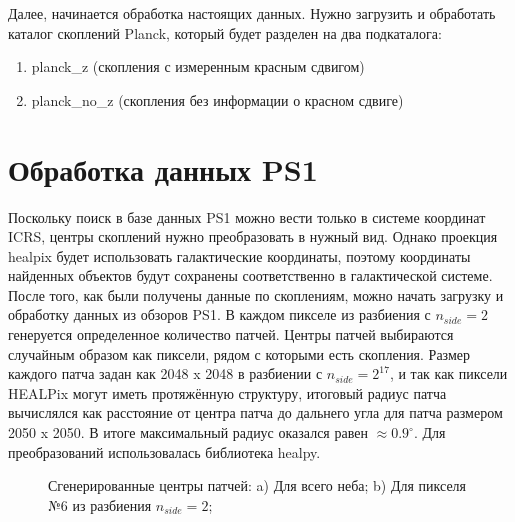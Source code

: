 Далее, начинается обработка настоящих данных. Нужно загрузить и обработать каталог скоплений Planck, 
который будет разделен на два подкаталога: 
\begin{enumerate}
	\item planck\_z (скопления с измеренным красным сдвигом)
	\item planck\_no\_z (скопления без информации о красном сдвиге)
\end{enumerate}

\section{Обработка данных PS1}

Поскольку поиск в базе данных PS1 можно вести только в системе координат ICRS, центры скоплений 
нужно преобразовать в нужный вид. Однако проекция healpix будет использовать галактические 
координаты, поэтому координаты найденных объектов будут сохранены соответственно в галактической 
системе.\\

После того, как были получены данные по скоплениям, можно начать загрузку и обработку данных из 
обзоров PS1. В каждом пикселе из разбиения с $n_{side}=2$ генеруется определенное количество патчей. 
Центры патчей выбираются случайным образом как пиксели, рядом с которыми есть скопления. Размер каждого 
патча задан как 2048 x 2048 в разбиении с $n_{side}=2^{17}$, и так как пиксели HEALPix могут иметь 
протяжённую структуру, итоговый радиус патча вычислялся как расстояние от центра патча до дальнего 
угла для патча размером 2050 x 2050. В итоге максимальный радиус оказался равен 
$\approx 0.9^{\circ}$. Для преобразований использовалась библиотека healpy.\\

\begin{figure}[ht]
	\begin{minipage}[h]{0.44\linewidth}
	\end{minipage}
	\begin{minipage}[h]{0.44\linewidth}
	\end{minipage}

	\caption{Сгенерированные центры патчей: a) Для всего неба; 
b) Для пикселя №6 из разбиения $n_{side}=2$;}
\end{figure}

